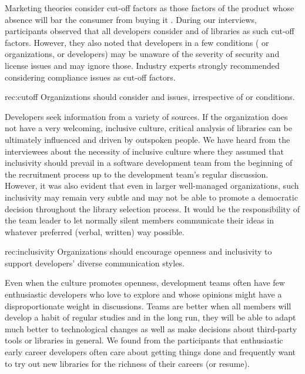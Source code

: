 Marketing theories consider cut-off factors as those factors of the product whose absence will bar the consumer from buying it \cite{blackwell2001consumer}. 
During our interviews, participants observed that all developers consider  and  of libraries as such cut-off factors. However, they also noted that developers in a few conditions ( or  organizations, or  developers) may be unaware of the severity of security and license issues and may ignore those. Industry experts strongly recommended  considering compliance issues as cut-off factors.
 \begin{recommendation}{rec:cutoff}
Organizations should consider  and  issues, irrespective of  or  conditions.
\end{recommendation}\medskip
Developers seek information from a variety of sources. If the organization does not have a very welcoming, inclusive culture, critical analysis of libraries can be ultimately influenced and driven by outspoken people. We have heard from the interviewees about the necessity of inclusive culture where they assumed that inclusivity should prevail in a software development team from the beginning of the recruitment process up to the development team's regular discussion. However, it was also evident that even in larger well-managed organizations, such inclusivity may remain very subtle and may not be able to promote a democratic decision throughout the library selection process. It would be the responsibility of the team leader to let normally silent members communicate their ideas in whatever preferred (verbal, written) way possible.
 \begin{recommendation}{rec:inclusivity}
Organizations should encourage openness and inclusivity to support developers' diverse communication styles. 
\end{recommendation}\medskip
 Even when the culture promotes openness, development teams often have few enthusiastic developers who love to explore and whose opinions might have a disproportionate weight in discussions. Teams are better when all members will develop a habit of regular studies and in the long run, they will be able to adapt much better to technological changes as well as make decisions about third-party tools or libraries in general. We found from the participants that enthusiastic early career developers often care about getting things done and frequently want to try out new libraries for the richness of their careers (or resume). %
